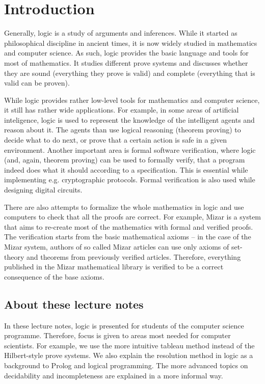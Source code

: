 
\chapter{Introduction}

Generally, logic is a study of arguments and inferences. While it started as philosophical discipline in ancient times, it is now widely studied in mathematics and computer science. As such, logic provides the basic language and tools for most of mathematics. It studies different prove systems and discusses whether they are sound (everything they prove is valid) and complete (everything that is valid can be proven). 

While logic provides rather low-level tools for mathematics and computer science, it still has rather wide applications. For example, in some areas of artificial inteligence, logic is used to represent the knowledge of the intelligent agents and reason about it. The agents than use logical reasoning (theorem proving) to decide what to do next, or prove that a certain action is safe in a given environment. Another important area is formal software verification, where logic (and, again, theorem proving) can be used to formally verify, that a program indeed does what it should according to a specification. This is essential while implementing e.g. cryptographic protocols. Formal verification is also used while designing digital circuits.

There are also attempts to formalize the whole mathematics in logic and use computers to check that all the proofs are correct. For example, Mizar is a system that aims to re-create most of the mathematics with formal and verified proofs. The verification starts from the basic mathematical axioms -- in the case of the Mizar system, authors of so called Mizar articles can use only axioms of set-theory and theorems from previously verified articles. Therefore, everything published in the Mizar mathematical library is verified to be a correct consequence of the base axioms.

\section{About these lecture notes}

In these lecture notes, logic is presented for students of the computer science programme. Therefore, focus is given to areas most needed for computer scientists. For example, we use the more intuitive tableau method instead of the Hilbert-style prove systems. We also explain the resolution method in logic as a background to Prolog and logical programming. The more advanced topics on decidability and incompleteness are explained in a more informal way.

